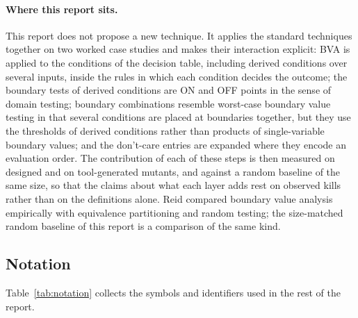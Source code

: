 \documentclass[11pt,a4paper]{article}
\begin{document}
\paragraph{Where this report sits.} This report does not propose a new
technique. It applies the standard techniques together on two worked case
studies and makes their interaction explicit: BVA is applied to the
conditions of the decision table, including derived conditions over several
inputs, inside the rules in which each condition decides the outcome; the
boundary tests of derived conditions are ON and OFF points in the sense of
domain testing; boundary combinations resemble worst-case boundary value
testing in that several conditions are placed at boundaries together, but
they use the thresholds of derived conditions rather than products of
single-variable boundary values; and the don't-care entries are
expanded where they encode an evaluation order. The contribution of each of
these steps is then measured on designed and on tool-generated mutants, and
against a random baseline of the same size, so that the claims about what
each layer adds rest on observed kills rather than on the definitions alone. Reid \cite{reid1997} compared boundary value analysis empirically with equivalence partitioning and random testing; the size-matched random baseline of this report is a comparison of the same kind.

\subsection{Notation}
\label{sec:bg-notation}

Table~\ref{tab:notation} collects the symbols and identifiers used in the
rest of the report.
\end{document}
